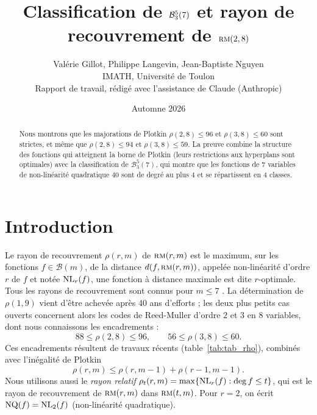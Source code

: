 \documentclass[11pt,a4paper]{article}
\title{Classification de $\bst(3,5,7)$ et rayon de recouvrement de $\rmc(2,8)$}
\author{Valérie Gillot, Philippe Langevin, Jean-Baptiste Nguyen\\
{\small IMATH, Université de Toulon}\\[4pt]
{\small Rapport de travail, rédigé avec l'assistance de Claude (Anthropic)}}
\date{Automne 2026}
\newcommand{\NQ}{\mathrm{NQ}}
\newcommand{\dist}{d}
\def\bst(#1,#2,#3){\mathcal{B}_{#1}^{#2}(#3)}
\def\NL(#1,#2){ {\rm NL}_{#1}(#2) }
\def\rmc(#1,#2){ \textsc {rm}(#1,#2) }
\def\boole(#1){\mathcal{B}(#1)}
\theoremstyle{plain}
\theoremstyle{definition}
\theoremstyle{remark}
\begin{document}
\maketitle

\begin{abstract}
Nous montrons que les majorations de Plotkin $\rho(2,8)\le 96$ et
$\rho(3,8)\le 60$ sont strictes, et même que $\rho(2,8)\le 94$ et
$\rho(3,8)\le 59$. La preuve combine la structure des fonctions
qui atteignent la borne de Plotkin (leurs restrictions aux hyperplans sont
optimales) avec la classification de $\bst(3,5,7)$, qui montre que les
fonctions de $7$ variables de non-linéarité quadratique $40$ sont de degré au
plus $4$ et se répartissent en $4$ classes.
\end{abstract}

\section{Introduction}

Le rayon de recouvrement $\rho(r,m)$ de $\rmc(r,m)$ est le maximum, sur les
fonctions $f\in\boole(m)$, de la distance $\dist(f,\rmc(r,m))$, appelée
non-linéarité d'ordre $r$ de $f$ et notée $\NL(r,f)$, une fonction
à distance maximale est dite $r$-optimale. Tous les rayons de
recouvrement sont connus pour $m\le 7$ \cite{MYK,HOU,Wang19,GKLW}. La détermination de $\rho(1,9)$ vient
d'être achevée \cite{RM19,HSS26} après 40 ans d'efforts
; les deux plus petits cas ouverts concernent alors les codes de Reed-Muller
d'ordre $2$ et $3$ en $8$ variables, dont nous connaissons les encadrements :
$$
88 \le \rho(2,8) \le 96, \qquad 56\le \rho(3,8)\le 60 .
$$
Ces encadrements résultent de travaux récents (table~\ref{tab:tab_rho}),
combinés avec l'inégalité de Plotkin
\begin{equation}\label{eq:plotkin}
\rho(r,m)\le \rho(r,m-1)+\rho(r-1,m-1).
\end{equation}
Nous utilisons aussi le \emph{rayon relatif} $\rho_t(r,m)=\max\{\NL(r,f) : \deg f\le t\}$, qui est
le rayon de recouvrement de $\rmc(r,m)$ dans $\rmc(t,m)$. Pour $r=2$,
on écrit $\NQ(f)=\NL(2,f)$ (non-linéarité quadratique).
\end{document}
